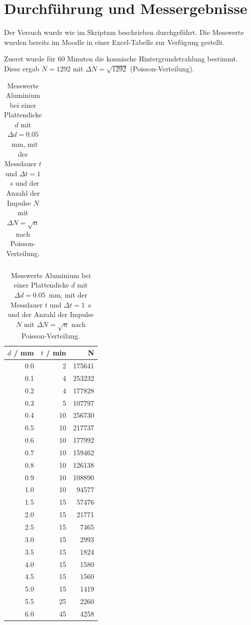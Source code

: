 \documentclass{article}
\begin{document}
\newpage

\section{Durchführung und Messergebnisse}

Der Versuch wurde wie im Skriptum beschrieben durchgeführt. Die Messwerte wurden bereits im Moodle in einer Excel-Tabelle zur Verfügung gestellt.

Zuerst wurde für 60 Minuten die kosmische Hintergrundstrahlung bestimmt. Diese ergab $N=1292$ mit $\Delta N = \sqrt{1292}$ (Poisson-Verteilung).


\begin{multicols}{2}


\begin{table}[H]
\caption{Messwerte Aluminium bei einer Plattendicke $d$ mit $\Delta d = 0.05$~mm, mit der Messdauer $t$ und $\Delta t=1$~s und der Anzahl der Impulse $N$ mit $\Delta N = \sqrt{n}$ nach Poisson-Verteilung.}

\begin{tabular}{cc}
\end{tabular}
\begin{tabular}{rrr}
$d$ / mm & $t$ / min & N \\
\hline
0.0 & 2 & 175641 \\
0.1 & 4 & 253232 \\
0.2 & 4 & 177828 \\
0.3 & 5 & 107797 \\
0.4 & 10 & 256730 \\
0.5 & 10 & 217737 \\
0.6 & 10 & 177992 \\
0.7 & 10 & 159462 \\
0.8 & 10 & 126138 \\
0.9 & 10 & 108890 \\
1.0 & 10 & 94577 \\
1.5 & 15 & 57476 \\
2.0 & 15 & 21771 \\
2.5 & 15 & 7465 \\
3.0 & 15 & 2993 \\
3.5 & 15 & 1824 \\
4.0 & 15 & 1580 \\
4.5 & 15 & 1560 \\
5.0 & 15 & 1419 \\
5.5 & 25 & 2260 \\
6.0 & 45 & 4258 
\end{tabular}
\end{table}


\end{multicols}
\end{document}
